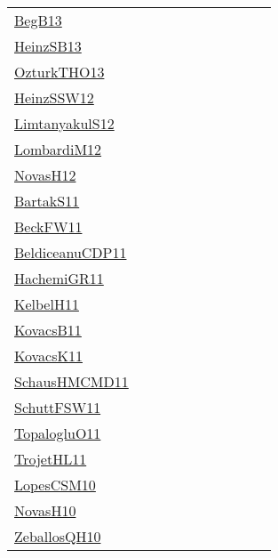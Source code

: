 {\begin{longtable}{p{3cm}p{4cm}p{2cm}p{2cm}p{2cm}p{2cm}p{2cm}p{2cm}p{2cm}p{2cm}}
\href{}{BegB13}~\cite{BegB13} &  &  &  &  &  &  &  &  & \\
\href{articles/HeinzSB13.pdf}{HeinzSB13}~\cite{HeinzSB13} &  &  &  &  &  &  &  &  & \\
\href{articles/OzturkTHO13.pdf}{OzturkTHO13}~\cite{OzturkTHO13} &  &  &  &  &  &  &  &  & \\
\href{articles/HeinzSSW12.pdf}{HeinzSSW12}~\cite{HeinzSSW12} &  &  &  &  &  &  &  &  & \\
\href{articles/LimtanyakulS12.pdf}{LimtanyakulS12}~\cite{LimtanyakulS12} &  &  &  &  &  &  &  &  & \\
\href{articles/LombardiM12.pdf}{LombardiM12}~\cite{LombardiM12} &  &  &  &  &  &  &  &  & \\
\href{articles/NovasH12.pdf}{NovasH12}~\cite{NovasH12} &  &  &  &  &  &  &  &  & \\
\href{articles/BartakS11.pdf}{BartakS11}~\cite{BartakS11} &  &  &  &  &  &  &  &  & \\
\href{}{BeckFW11}~\cite{BeckFW11} &  &  &  &  &  &  &  &  & \\
\href{articles/BeldiceanuCDP11.pdf}{BeldiceanuCDP11}~\cite{BeldiceanuCDP11} &  &  &  &  &  &  &  &  & \\
\href{articles/HachemiGR11.pdf}{HachemiGR11}~\cite{HachemiGR11} &  &  &  &  &  &  &  &  & \\
\href{articles/KelbelH11.pdf}{KelbelH11}~\cite{KelbelH11} &  &  &  &  &  &  &  &  & \\
\href{articles/KovacsB11.pdf}{KovacsB11}~\cite{KovacsB11} &  &  &  &  &  &  &  &  & \\
\href{articles/KovacsK11.pdf}{KovacsK11}~\cite{KovacsK11} &  &  &  &  &  &  &  &  & \\
\href{articles/SchausHMCMD11.pdf}{SchausHMCMD11}~\cite{SchausHMCMD11} &  &  &  &  &  &  &  &  & \\
\href{articles/SchuttFSW11.pdf}{SchuttFSW11}~\cite{SchuttFSW11} &  &  &  &  &  &  &  &  & \\
\href{articles/TopalogluO11.pdf}{TopalogluO11}~\cite{TopalogluO11} &  &  &  &  &  &  &  &  & \\
\href{articles/TrojetHL11.pdf}{TrojetHL11}~\cite{TrojetHL11} &  &  &  &  &  &  &  &  & \\
\href{articles/LopesCSM10.pdf}{LopesCSM10}~\cite{LopesCSM10} &  &  &  &  &  &  &  &  & \\
\href{articles/NovasH10.pdf}{NovasH10}~\cite{NovasH10} &  &  &  &  &  &  &  &  & \\
\href{articles/ZeballosQH10.pdf}{ZeballosQH10}~\cite{ZeballosQH10} &  &  &  &  &  &  &  &  & \\

\end{longtable}}
